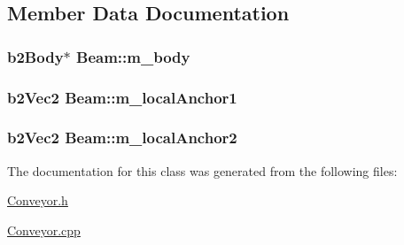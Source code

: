 \subsection{Member Data Documentation}
\hypertarget{classBeam_a282db593ede22f681dbf57729fd203b0}{
\subsubsection[{m\-\_\-body}]{\setlength{\rightskip}{0pt plus 5cm}b2\-Body$\ast$ Beam\-::m\-\_\-body\hspace{0.3cm}{\ttfamily [private]}}}\label{classBeam_a282db593ede22f681dbf57729fd203b0}
\hypertarget{classBeam_a4155af3bd2f382a56d5cbf275b626a22}{
\subsubsection[{m\-\_\-local\-Anchor1}]{\setlength{\rightskip}{0pt plus 5cm}b2\-Vec2 Beam\-::m\-\_\-local\-Anchor1\hspace{0.3cm}{\ttfamily [private]}}}\label{classBeam_a4155af3bd2f382a56d5cbf275b626a22}
\hypertarget{classBeam_a00a74039f9b2feb4e440200cca2046b2}{
\subsubsection[{m\-\_\-local\-Anchor2}]{\setlength{\rightskip}{0pt plus 5cm}b2\-Vec2 Beam\-::m\-\_\-local\-Anchor2\hspace{0.3cm}{\ttfamily [private]}}}\label{classBeam_a00a74039f9b2feb4e440200cca2046b2}


The documentation for this class was generated from the following files\-:\begin{DoxyCompactItemize}
\item 
\hyperlink{Conveyor_8h}{Conveyor.\-h}\item 
\hyperlink{Conveyor_8cpp}{Conveyor.\-cpp}\end{DoxyCompactItemize}
